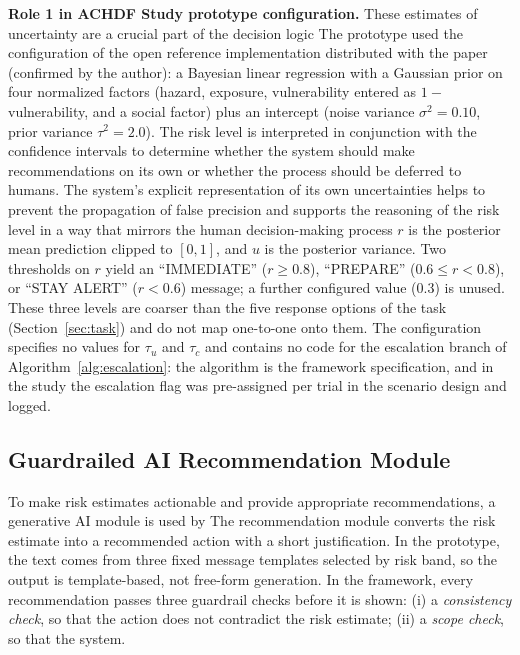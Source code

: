 \documentclass[journal]{IEEEtran}
\theoremstyle{plain}
\theoremstyle{definition}
\providecommand{\DIFaddtex}[1]{{\protect\color{blue} \sf #1}} %
\providecommand{\DIFdeltex}[1]{{\protect\color{red} \scriptsize #1}} %
\providecommand{\DIFaddbegin}{} %
\providecommand{\DIFaddend}{} %
\providecommand{\DIFdelbegin}{} %
\providecommand{\DIFdelend}{} %
\providecommand{\DIFadd}[1]{\texorpdfstring{\DIFaddtex{#1}}{#1}} %
\providecommand{\DIFdel}[1]{\texorpdfstring{\DIFdeltex{#1}}{}} %
\newcommand{\DIFscaledelfig}{0.5}
\newlength{\DIFdelgraphicswidth} %
\newlength{\DIFdelgraphicsheight} %
\newcommand{\DIFaddincludegraphics}[2][]{{\color{blue}\fbox{\DIFOincludegraphics[#1]{#2}}}} %
\newcommand{\DIFdelincludegraphics}[2][]{%
\sbox{\DIFdelgraphicsbox}{\DIFOincludegraphics[#1]{#2}}%
\settoboxwidth{\DIFdelgraphicswidth}{\DIFdelgraphicsbox} %
\settoboxtotalheight{\DIFdelgraphicsheight}{\DIFdelgraphicsbox} %
\scalebox{\DIFscaledelfig}{%
\parbox[b]{\DIFdelgraphicswidth}{\usebox{\DIFdelgraphicsbox}\\[-\baselineskip] \rule{\DIFdelgraphicswidth}{0em}}\llap{\resizebox{\DIFdelgraphicswidth}{\DIFdelgraphicsheight}{%
\setlength{\unitlength}{\DIFdelgraphicswidth}%
\begin{picture}(1,1)%
\thicklines\linethickness{2pt} %
{\color[rgb]{1,0,0}\put(0,0){\framebox(1,1){}}}%
{\color[rgb]{1,0,0}\put(0,0){\line( 1,1){1}}}%
{\color[rgb]{1,0,0}\put(0,1){\line(1,-1){1}}}%
\end{picture}%
}\hspace*{3pt}}} %
} %
\DeclareRobustCommand{\DIFaddbegin}{\DIFOaddbegin \let\includegraphics\DIFaddincludegraphics} %
\DeclareRobustCommand{\DIFaddend}{\DIFOaddend \let\includegraphics\DIFOincludegraphics} %
\DeclareRobustCommand{\DIFdelbegin}{\DIFOdelbegin \let\includegraphics\DIFdelincludegraphics} %
\DeclareRobustCommand{\DIFdelend}{\DIFOaddend \let\includegraphics\DIFOincludegraphics} %
\begin{document}
    \textbf{\DIFdelbegin \DIFdel{Role 1 in ACHDF}\DIFdelend \DIFaddbegin \DIFadd{Study prototype configuration}\DIFaddend .} \DIFdelbegin \DIFdel{These estimates of uncertainty are a crucial part of the decision logic}\DIFdelend \DIFaddbegin \DIFadd{The prototype used the configuration of the open reference implementation distributed with the paper (confirmed by the author): a Bayesian linear regression with a Gaussian prior on four normalized factors (hazard, exposure, vulnerability entered as $1-$vulnerability, and a social factor) plus an intercept (noise variance $\sigma^2=0.10$, prior variance $\tau^2=2.0$)}\DIFaddend . The risk level \DIFdelbegin \DIFdel{is interpreted in conjunction with the confidence intervals to determine whether the system should make recommendations on its own or whether the process should be deferred to humans. The system’s explicit representation of its own uncertainties helps to prevent the propagation of false precision and supports the reasoning of the risk level in a way that mirrors the human decision-making process}\DIFdelend \DIFaddbegin \DIFadd{$r$ is the posterior mean prediction clipped to $[0,1]$, and $u$ is the posterior variance. Two thresholds on $r$ yield an ``IMMEDIATE'' ($r \ge 0.8$), ``PREPARE'' ($0.6 \le r < 0.8$), or ``STAY ALERT'' ($r < 0.6$) message; a further configured value (0.3) is unused. These three levels are coarser than the five response options of the task (Section~\ref{sec:task}) and do not map one-to-one onto them. The configuration specifies no values for $\tau_u$ and $\tau_c$ and contains no code for the escalation branch of Algorithm~\ref{alg:escalation}: the algorithm is the framework specification, and in the study the escalation flag was pre-assigned per trial in the scenario design and logged}\DIFaddend .

    \subsection{Guardrailed AI Recommendation Module}
    \DIFdelbegin \DIFdel{To make risk estimates actionable and provide appropriate recommendations, a generative AI module is used by }\DIFdelend \DIFaddbegin \label{sec:guardrails}
    \DIFadd{The recommendation module converts the risk estimate into a recommended action with a short justification. In the prototype, the text comes from three fixed message templates selected by risk band, so the output is template-based, not free-form generation. In the framework, every recommendation passes three guardrail checks before it is shown: (i) a \emph{consistency check}, so that the action does not contradict the risk estimate; (ii) a \emph{scope check}, so that }\DIFaddend the \DIFdelbegin \DIFdel{system. }%
\end{document}
